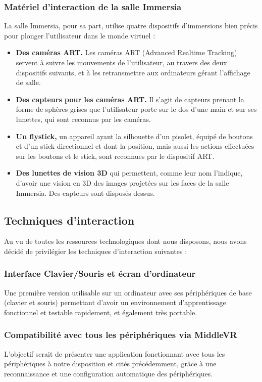 \subsubsection{Matériel d'interaction de la salle Immersia}
La salle Immersia, pour sa part, utilise quatre dispositifs d'immersions bien précis pour plonger l'utilisateur dans le monde virtuel :
\begin{itemize}\renewcommand{\labelitemi}{$\bullet$}
\item \textbf{Des caméras ART.} Les caméras ART (Advanced Realtime Tracking) servent à suivre les mouvements de l'utilisateur, au travers des deux dispositifs suivants, et à les retransmettre aux ordinateurs gérant l'affichage de salle.
\item \textbf{Des capteurs pour les caméras ART.} Il s'agit de capteurs prenant la forme de sphères grises que l'utilisateur porte sur le dos d'une main et sur ses lunettes, qui sont reconnus par les caméras. 
\item \textbf{Un flystick,} un appareil ayant la silhouette d'un pisolet, équipé de boutons et d'un stick directionnel et dont la position, mais aussi les actions effectuées sur les boutons et le stick, sont reconnues par le dispositif ART.
\item \textbf{Des lunettes de vision 3D} qui permettent, comme leur nom l'indique, d'avoir une vision en 3D des images projetées sur les faces de la salle Immersia. Des capteurs sont disposés dessus.
\end{itemize}

\subsection{Techniques d'interaction}
Au vu de toutes les ressources technologiques dont nous disposons, nous avons décidé de privilégier les techniques d'interaction suivantes :

\subsubsection{Interface Clavier/Souris et écran d'ordinateur}
Une première version utilisable sur un ordinateur avec ses périphériques de base (clavier et souris) permettant d'avoir un environnement d'apprentissage fonctionnel et testable rapidement, et également très portable.

\subsubsection{Compatibilité avec tous les périphériques via MiddleVR}
L'objectif serait de présenter une application fonctionnant avec tous les périphériques à notre disposition et cités précédemment, grâce à une reconnaissance et une configuration automatique des périphériques.
\\
